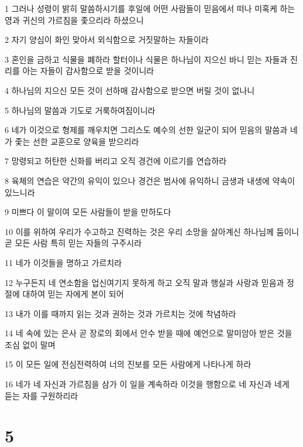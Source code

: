 \par 1 그러나 성령이 밝히 말씀하시기를 후일에 어떤 사람들이 믿음에서 떠나 미혹케 하는 영과 귀신의 가르침을 좇으리라 하셨으니
\par 2 자기 양심이 화인 맞아서 외식함으로 거짓말하는 자들이라
\par 3 혼인을 금하고 식물을 폐하라 할터이나 식물은 하나님이 지으신 바니 믿는 자들과 진리를 아는 자들이 감사함으로 받을 것이니라
\par 4 하나님의 지으신 모든 것이 선하매 감사함으로 받으면 버릴 것이 없나니
\par 5 하나님의 말씀과 기도로 거룩하여짐이니라
\par 6 네가 이것으로 형제를 깨우치면 그리스도 예수의 선한 일군이 되어 믿음의 말씀과 네가 좇는 선한 교훈으로 양육을 받으리라
\par 7 망령되고 허탄한 신화를 버리고 오직 경건에 이르기를 연습하라
\par 8 육체의 연습은 약간의 유익이 있으나 경건은 범사에 유익하니 금생과 내생에 약속이 있느니라
\par 9 미쁘다 이 말이여 모든 사람들이 받을 만하도다
\par 10 이를 위하여 우리가 수고하고 진력하는 것은 우리 소망을 살아계신 하나님께 둠이니 곧 모든 사람 특히 믿는 자들의 구주시라
\par 11 네가 이것들을 명하고 가르치라
\par 12 누구든지 네 연소함을 업신여기지 못하게 하고 오직 말과 행실과 사랑과 믿음과 정절에 대하여 믿는 자에게 본이 되어
\par 13 내가 이를 때까지 읽는 것과 권하는 것과 가르치는 것에 착념하라
\par 14 네 속에 있는 은사 곧 장로의 회에서 안수 받을 때에 예언으로 말미암아 받은 것을 조심 없이 말며
\par 15 이 모든 일에 전심전력하여 너의 진보를 모든 사람에게 나타나게 하라
\par 16 네가 네 자신과 가르침을 삼가 이 일을 계속하라 이것을 행함으로 네 자신과 네게 듣는 자를 구원하리라

\chapter{5}

